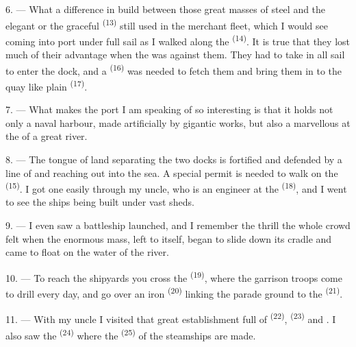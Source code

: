 6. --- What a difference in build between those great masses of steel and the elegant
 or the graceful  \textsuperscript{(13)} still
used in the merchant fleet, which I would see coming into port under full sail as I walked
along the  \textsuperscript{(14)}. It is true that they lost much of their
advantage when the  was against them. They had to take in all sail to enter the
dock, and a
 \textsuperscript{(16)} was needed to fetch them and bring them in to the
quay like plain  \textsuperscript{(17)}.

\VUsaut{3.0mm}
\VUsaut{3.0mm}

7. --- What makes the port I am speaking of so interesting is that it holds not only a naval
harbour, made artificially by gigantic works, but also a marvellous 
at the  of a great river.

8. --- The tongue of land separating the two docks is fortified and defended by a line of
 and  reaching out into the sea. A special permit is needed
to walk on the
 \textsuperscript{(15)}. I got one easily through my
uncle, who is an engineer at the  \textsuperscript{(18)}, and I went to see
the ships being built under vast sheds.

9. --- I even saw a battleship launched, and I remember the thrill the whole crowd felt when
the enormous mass, left to itself, began to slide down its cradle and came to float on the
water of the river.

10. --- To reach the shipyards you cross the  \textsuperscript{(19)},
where the garrison troops come to drill every day, and go over an iron 
\textsuperscript{(20)} linking the parade ground to the 
\textsuperscript{(21)}.

\VUsaut{3.0mm}
\VUsaut{3.0mm}

11. --- With my uncle I visited that great establishment full of
 \textsuperscript{(22)},  \textsuperscript{(23)} and
. I also saw the  \textsuperscript{(24)} where the
 \textsuperscript{(25)} of the steamships are made.

